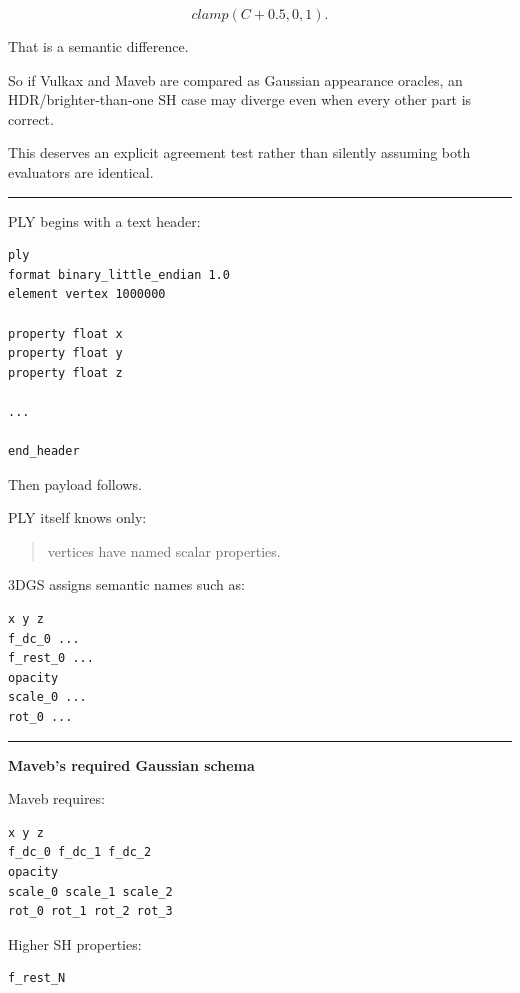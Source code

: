 \[
clamp(C+0.5,0,1).
\]

That is a semantic difference.

So if Vulkax and Maveb are compared as Gaussian appearance oracles, an HDR/brighter-than-one SH case may diverge even when every other part is correct.

This deserves an explicit agreement test rather than silently assuming both evaluators are identical.

\begin{center}\rule{0.5\linewidth}{0.5pt}\end{center}

PLY begins with a text header:

\protect{}\label{zw47bm}%
\begin{verbatim}
ply
format binary_little_endian 1.0
element vertex 1000000

property float x
property float y
property float z

...

end_header
\end{verbatim}

Then payload follows.

PLY itself knows only:

\begin{quote}
vertices have named scalar properties.
\end{quote}

3DGS assigns semantic names such as:

\protect{}\label{f1u91b}%
\begin{verbatim}
x y z
f_dc_0 ...
f_rest_0 ...
opacity
scale_0 ...
rot_0 ...
\end{verbatim}

\begin{center}\rule{0.5\linewidth}{0.5pt}\end{center}

\textbf{Maveb's required Gaussian schema}

Maveb requires:

\protect{}\label{8jo8qo}%
\begin{verbatim}
x y z
f_dc_0 f_dc_1 f_dc_2
opacity
scale_0 scale_1 scale_2
rot_0 rot_1 rot_2 rot_3
\end{verbatim}

Higher SH properties:

\protect{}\label{m1flmm}%
\begin{verbatim}
f_rest_N
\end{verbatim}

